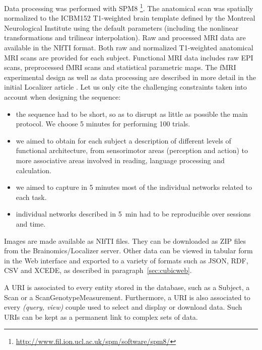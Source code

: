 \documentclass[preprint,12pt]{elsarticle}
\begin{document}
Data processing was performed with SPM8 \footnote{\url{http://www.fil.ion.ucl.ac.uk/spm/software/spm8/}}. The anatomical scan was spatially normalized to the ICBM152 T1-weighted brain template defined by the Montreal Neurological Institute using the default parameters (including the nonlinear transformations and trilinear interpolation). Raw and processed MRI data are available in the NIfTI format. Both raw and normalized T1-weighted anatomical MRI scans are provided for each subject. Functional MRI data includes raw EPI scans, preprocessed fMRI scans and statistical parametric maps. The fMRI experimental design as well as data processing are described in more detail in the initial Localizer article \cite{Pinel2007}. Let us only cite the challenging constraints taken into account when designing the sequence:
\begin{itemize}
\item the sequence had to be short, so as to disrupt as little as possible the main protocol. We choose 5 minutes for performing 100 trials.
\item we aimed to obtain for each subject a description of different levels of functional architecture, from sensorimotor areas (perception and action) to more associative areas involved in reading, language processing and calculation.
\item we aimed to capture in 5 minutes most of the individual networks related to each task.
\item individual networks described in 5~min had to be reproducible over sessions and time.
\end{itemize}

Images are made available as NIfTI files. They can be downloaded as ZIP files from the Brainomics/Localizer server. Other data can be viewed in tabular form in the Web interface and exported to a variety of formats such as JSON, RDF, CSV and XCEDE, as described in paragraph~\ref{sec:cubicweb}.

A URI is associated to every entity stored in the database, such as a Subject, a Scan or a ScanGenotypeMeasurement. Furthermore, a URI is also associated to every \emph{(query, view)} couple used to select and display or download data. Such URIs can be kept as a permanent link to complex sets of data.
\end{document}
